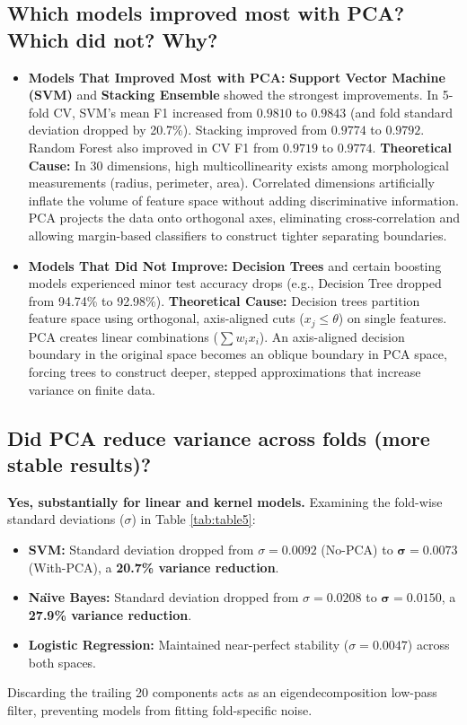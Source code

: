 \documentclass[12pt,a4paper]{article}
\begin{document}
\subsection{Which models improved most with PCA? Which did not? Why?}
\begin{itemize}[leftmargin=*]
\item \textbf{Models That Improved Most with PCA:}
\textbf{Support Vector Machine (SVM)} and \textbf{Stacking Ensemble} showed the strongest improvements. In 5-fold CV, SVM's mean F1 increased from $0.9810$ to $\mathbf{0.9843}$ (and fold standard deviation dropped by 20.7\%). Stacking improved from $0.9774$ to $\mathbf{0.9792}$. Random Forest also improved in CV F1 from $0.9719$ to $\mathbf{0.9774}$.
\newline\textbf{Theoretical Cause:} In 30 dimensions, high multicollinearity exists among morphological measurements (radius, perimeter, area). Correlated dimensions artificially inflate the volume of feature space without adding discriminative information. PCA projects the data onto orthogonal axes, eliminating cross-correlation and allowing margin-based classifiers to construct tighter separating boundaries.
\item \textbf{Models That Did Not Improve:}
\textbf{Decision Trees} and certain boosting models experienced minor test accuracy drops (e.g., Decision Tree dropped from 94.74\% to 92.98\%).
\newline\textbf{Theoretical Cause:} Decision trees partition feature space using orthogonal, axis-aligned cuts ($x_j \le \theta$) on single features. PCA creates linear combinations ($\sum w_i x_i$). An axis-aligned decision boundary in the original space becomes an oblique boundary in PCA space, forcing trees to construct deeper, stepped approximations that increase variance on finite data.
\end{itemize}

\subsection{Did PCA reduce variance across folds (more stable results)?}
\textbf{Yes, substantially for linear and kernel models.}
Examining the fold-wise standard deviations ($\sigma$) in Table \ref{tab:table5}:
\begin{itemize}
\item \textbf{SVM:} Standard deviation dropped from $\sigma = 0.0092$ (No-PCA) to $\mathbf{\sigma = 0.0073}$ (With-PCA), a \textbf{20.7\% variance reduction}.
\item \textbf{Na\"\i ve Bayes:} Standard deviation dropped from $\sigma = 0.0208$ to $\mathbf{\sigma = 0.0150}$, a \textbf{27.9\% variance reduction}.
\item \textbf{Logistic Regression:} Maintained near-perfect stability ($\sigma = 0.0047$) across both spaces.
\end{itemize}
Discarding the trailing 20 components acts as an eigendecomposition low-pass filter, preventing models from fitting fold-specific noise.
\end{document}
